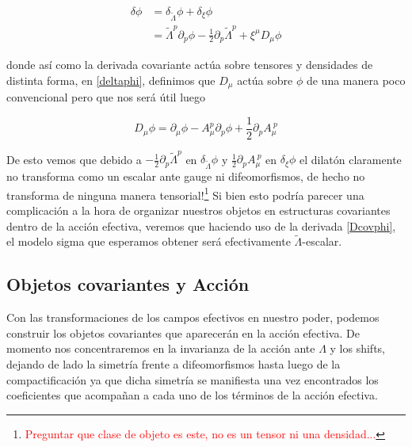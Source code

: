 \documentclass{article}
\numberwithin{equation}{section}
\begin{document}
\begin{boxeq}
	\begin{equation}\label{deltaphi}
	\begin{aligned}
	\delta \phi &= \delta_{\widetilde{\Lambda}} \phi + \delta_{\xi} \phi\\
	&= \widetilde{\Lambda}^p \partial_p \phi - \frac{1}{2} \partial_p \widetilde{\Lambda}^p + \xi^{\mu} D_{\mu} \phi 
	\end{aligned}
	\end{equation}
\end{boxeq}

donde así como la derivada covariante actúa sobre tensores y densidades de distinta forma, en \ref{deltaphi}, definimos que $ D_{\mu} $ actúa sobre $ \phi $ de una manera poco convencional pero que nos será útil luego

\begin{equation}\label{Dcovphi}
D_{\mu} \phi = \partial_{\mu} \phi - A_{\mu}^p \partial_p \phi + \frac{1}{2} \partial_p A_{\mu}^{\ p}
\end{equation}

De esto vemos que debido a $ - \frac{1}{2} \partial_p \widetilde{\Lambda}^p $ en $ \delta_{\widetilde{\Lambda}} \phi $ y $ \frac{1}{2} \partial_p A_{\mu}^{\ p} $ en $ \delta_{\xi} \phi $ el dilatón claramente no transforma como un escalar ante gauge ni difeomorfismos, de hecho no transforma de ninguna manera tensorial!\footnote{\textcolor{red}{Preguntar que clase de objeto es este, no es un tensor ni una densidad...}} Si bien esto podría parecer una complicación a la hora de organizar nuestros objetos en estructuras covariantes dentro de la acción efectiva, veremos que haciendo uso de la derivada \ref{Dcovphi}, el modelo sigma que esperamos obtener será efectivamente $ \widetilde{\Lambda}$-escalar. 



\subsection{Objetos covariantes y Acción}\label{accion}

Con las transformaciones de los campos efectivos en nuestro poder, podemos construir los objetos covariantes que aparecerán en la acción efectiva. De momento nos concentraremos en la invarianza de la acción ante $ \Lambda $ y los shifts, dejando de lado la simetría frente a difeomorfismos hasta luego de la compactificación ya que dicha simetría se manifiesta una vez encontrados los coeficientes que acompañan a cada uno de los términos de la acción efectiva.
\end{document}
